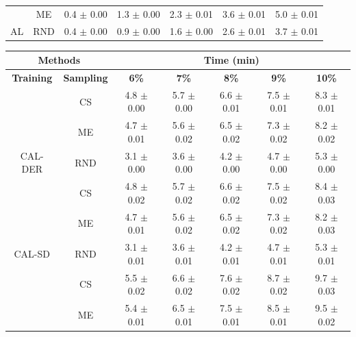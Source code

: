 \begin{table}[htbp]
\begin{tabular*}{\linewidth}{c|c|@{\extracolsep{\fill}}ccccc}
 & ME & 0.4 $\pm$ {\small 0.00} & 1.3 $\pm$ {\small 0.00} & 2.3 $\pm$ {\small 0.01} & 3.6 $\pm$ {\small 0.01} & 5.0 $\pm$ {\small 0.01}\\

\multirow{-3}{*}{\raggedright\arraybackslash AL} & RND & 0.4 $\pm$ {\small 0.00} & 0.9 $\pm$ {\small 0.00} & 1.6 $\pm$ {\small 0.00} & 2.6 $\pm$ {\small 0.01} & 3.7 $\pm$ {\small 0.01}\\
\bottomrule
\end{tabular*}
\vspace{0.5em}

\begin{tabular*}{\linewidth}{c|c|@{\extracolsep{\fill}}ccccc}
\toprule
\multicolumn{2}{c|}{\textbf{Methods}} & \multicolumn{5}{c}{\textbf{Time (min)}} \\
\midrule
\textbf{Training} & \textbf{Sampling} & \textbf{6\%} & \textbf{7\%} & \textbf{8\%} & \textbf{9\%} & \textbf{10\%}\\
\midrule
 & CS & 4.8 $\pm$ {\small 0.00} & 5.7 $\pm$ {\small 0.00} & 6.6 $\pm$ {\small 0.01} & 7.5 $\pm$ {\small 0.01} & 8.3 $\pm$ {\small 0.01}\\

 & ME & 4.7 $\pm$ {\small 0.01} & 5.6 $\pm$ {\small 0.02} & 6.5 $\pm$ {\small 0.02} & 7.3 $\pm$ {\small 0.02} & 8.2 $\pm$ {\small 0.02}\\

\multirow{-3}{*}{\raggedright\arraybackslash CAL-DER} & RND & 3.1 $\pm$ {\small 0.00} & 3.6 $\pm$ {\small 0.00} & 4.2 $\pm$ {\small 0.00} & 4.7 $\pm$ {\small 0.00} & 5.3 $\pm$ {\small 0.00}\\
\midrule
 & CS & 4.8 $\pm$ {\small 0.02} & 5.7 $\pm$ {\small 0.02} & 6.6 $\pm$ {\small 0.02} & 7.5 $\pm$ {\small 0.02} & 8.4 $\pm$ {\small 0.03}\\

 & ME & 4.7 $\pm$ {\small 0.01} & 5.6 $\pm$ {\small 0.02} & 6.5 $\pm$ {\small 0.02} & 7.3 $\pm$ {\small 0.02} & 8.2 $\pm$ {\small 0.03}\\

\multirow{-3}{*}{\raggedright\arraybackslash CAL-SD} & RND & 3.1 $\pm$ {\small 0.01} & 3.6 $\pm$ {\small 0.01} & 4.2 $\pm$ {\small 0.01} & 4.7 $\pm$ {\small 0.01} & 5.3 $\pm$ {\small 0.01}\\
\midrule
 & CS & 5.5 $\pm$ {\small 0.02} & 6.6 $\pm$ {\small 0.02} & 7.6 $\pm$ {\small 0.02} & 8.7 $\pm$ {\small 0.02} & 9.7 $\pm$ {\small 0.03}\\

 & ME & 5.4 $\pm$ {\small 0.01} & 6.5 $\pm$ {\small 0.01} & 7.5 $\pm$ {\small 0.01} & 8.5 $\pm$ {\small 0.01} & 9.5 $\pm$ {\small 0.02}\\


\end{tabular*}
\end{table}
